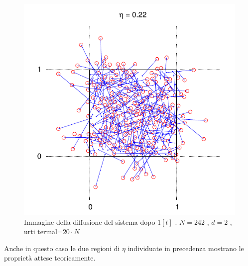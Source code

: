 \documentclass[11pt]{article}
\theoremstyle{plain}
\theoremstyle{remark}
\begin{document}
  \begin{figure}[h!]\vspace{-10pt}
     \begin{minipage}{0.4\textwidth}
		\begin{flushright}
			\includegraphics[scale=0.55]{Immagini/Rigide/Eta4_2D}
		\end{flushright}
     \end{minipage}\hfill
     \begin{minipage}{0.4\textwidth}
     	\begin{flushleft}
		\caption[Sfere Rigide$/$Preliminari\_Diffusione.cpp]{Immagine della diffusione del sistema dopo $1 [t]$ . \newline \footnotesize{$N= 242$ , $d=2$ ,  urti termal=$ 20 \cdot N$}}
     \end{flushleft}
     \end{minipage}\vspace{-10pt}
  \end{figure}
Anche in questo caso le due regioni di $\eta$ individuate in precedenza mostrano le proprietà attese teoricamente.
\end{document}
